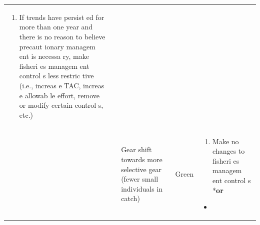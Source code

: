 \documentclass[]{book}
\providecommand{\tightlist}{%
  \setlength{\itemsep}{0pt}\setlength{\parskip}{0pt}}
\begin{document}
\begin{longtable}[]{@{}lllll@{}}
\begin{minipage}[t]{0.19\columnwidth}
\begin{enumerate}
\def\labelenumi{\arabic{enumi}.}
\setcounter{enumi}{1}
\tightlist
\item
  If trends have persist ed for more than one year and there is no
  reason to believe precaut ionary managem ent is necessa ry, make
  fisheri es managem ent control s less restric tive (i.e., increas e
  TAC, increas e allowab le effort, remove or modify certain control s,
  etc.)
\end{enumerate}\strut
\end{minipage}\tabularnewline
\begin{minipage}[t]{0.19\columnwidth}\raggedright\strut
\strut
\end{minipage} & \begin{minipage}[t]{0.19\columnwidth}\raggedright\strut
\strut
\end{minipage} & \begin{minipage}[t]{0.19\columnwidth}\raggedright\strut
Gear shift towards more selective gear (fewer small individuals in
catch)\strut
\end{minipage} & \begin{minipage}[t]{0.19\columnwidth}\raggedright\strut
Green\strut
\end{minipage} & \begin{minipage}[t]{0.19\columnwidth}\raggedright\strut
\begin{enumerate}
\def\labelenumi{\arabic{enumi}.}
\tightlist
\item
  Make no changes to fisheri es managem ent control s *\textbf{or}
\end{enumerate}

\begin{itemize}
\item
\end{itemize}


\end{minipage}
\end{longtable}
\end{document}
